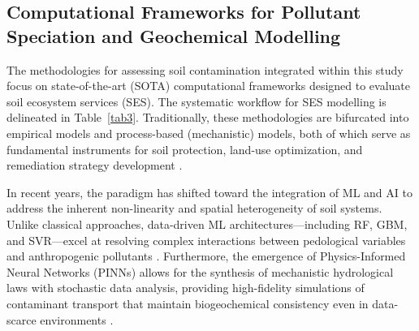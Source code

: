 \documentclass[environments,article,submit,pdftex,moreauthors]{Definitions/mdpi}
\begin{document}
\subsection{Computational Frameworks for Pollutant Speciation and
    Geochemical Modelling}\label{sec3.3}

The methodologies for assessing soil contamination integrated within this
study focus on state-of-the-art (SOTA) computational frameworks designed to
evaluate soil ecosystem services (SES). The systematic workflow for SES
modelling is delineated in Table~\ref{tab3}. Traditionally, these
methodologies are bifurcated into empirical models and process-based
(mechanistic) models, both of which serve as fundamental instruments for soil
protection, land-use optimization, and remediation strategy development
\cite{TeranGomez2025,ElSorogy2025,Sandu2025}.

In recent years, the paradigm has shifted toward the integration of ML and AI
to address the inherent non-linearity and spatial heterogeneity of soil
systems. Unlike classical approaches, data-driven ML architectures---including
RF, GBM, and SVR---excel at resolving complex interactions between pedological
variables and anthropogenic pollutants \cite{Li2025a,Racic2025}. Furthermore,
the emergence of Physics-Informed Neural Networks (PINNs) allows for the
synthesis of mechanistic hydrological laws with stochastic data analysis,
providing high-fidelity simulations of contaminant transport that maintain
biogeochemical consistency even in data-scarce environments \cite{Haruzi}.
\end{document}
